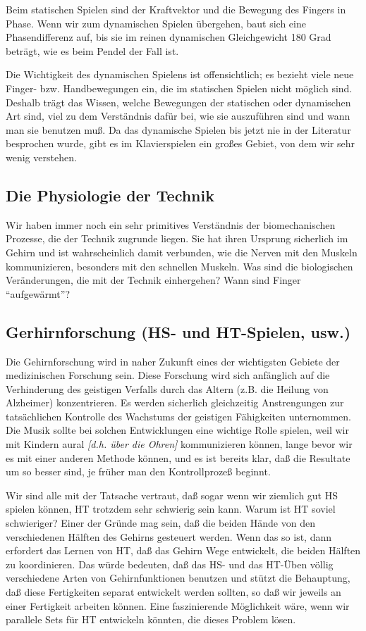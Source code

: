 Beim statischen Spielen sind der Kraftvektor und die Bewegung des Fingers in Phase.
Wenn wir zum dynamischen Spielen übergehen, baut sich eine Phasendifferenz auf, bis sie im reinen dynamischen Gleichgewicht 180 Grad beträgt, wie es beim Pendel der Fall ist.

Die Wichtigkeit des dynamischen Spielens ist offensichtlich; es bezieht viele neue Finger- bzw. Handbewegungen ein, die im statischen Spielen nicht möglich sind.
Deshalb trägt das Wissen, welche Bewegungen der statischen oder dynamischen Art sind, viel zu dem Verständnis dafür bei, wie sie auszuführen sind und wann man sie benutzen muß.
Da das dynamische Spielen bis jetzt nie in der Literatur besprochen wurde, gibt es im Klavierspielen ein großes Gebiet, von dem wir sehr wenig verstehen.


\subsection{Die Physiologie der Technik}\hypertarget{c1iv6b}{}

Wir haben immer noch ein sehr primitives Verständnis der biomechanischen Prozesse, die der Technik zugrunde liegen.
Sie hat ihren Ursprung sicherlich im Gehirn und ist wahrscheinlich damit verbunden, wie die Nerven mit den Muskeln kommunizieren, besonders mit den schnellen Muskeln.
Was sind die biologischen Veränderungen, die mit der Technik einhergehen?
Wann sind Finger \enquote{aufgewärmt}?


\subsection{Gerhirnforschung (HS- und HT-Spielen, usw.)}\hypertarget{c1iv6c}{}

Die Gehirnforschung wird in naher Zukunft eines der wichtigsten Gebiete der medizinischen Forschung sein.
Diese Forschung wird sich anfänglich auf die Verhinderung des geistigen Verfalls durch das Altern (z.B. die Heilung von Alzheimer) konzentrieren.
Es werden sicherlich gleichzeitig Anstrengungen zur tatsächlichen Kontrolle des Wachstums der geistigen Fähigkeiten unternommen.
Die Musik sollte bei solchen Entwicklungen eine wichtige Rolle spielen, weil wir mit Kindern aural \textit{[d.h. über die Ohren]} kommunizieren können, lange bevor wir es mit einer anderen Methode können, und es ist bereits klar, daß die Resultate um so besser sind, je früher man den Kontrollprozeß beginnt.

Wir sind alle mit der Tatsache vertraut, daß sogar wenn wir ziemlich gut HS spielen können, HT trotzdem sehr schwierig sein kann.
Warum ist HT soviel schwieriger?
Einer der Gründe mag sein, daß die beiden Hände von den verschiedenen Hälften des Gehirns gesteuert werden.
Wenn das so ist, dann erfordert das Lernen von HT, daß das Gehirn Wege entwickelt, die beiden Hälften zu koordinieren.
Das würde bedeuten, daß das HS- und das HT-Üben völlig verschiedene Arten von Gehirnfunktionen benutzen und stützt die Behauptung, daß diese Fertigkeiten separat entwickelt werden sollten, so daß wir jeweils an einer Fertigkeit arbeiten können.
Eine faszinierende Möglichkeit wäre, wenn wir parallele Sets für HT entwickeln könnten, die dieses Problem lösen.


